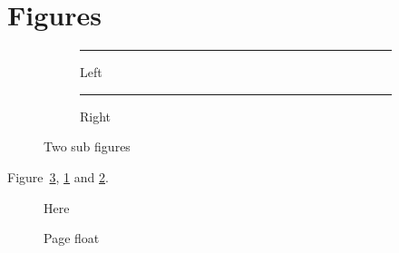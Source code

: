 \documentclass{article}
\begin{document}
\listoffigures
\section{Figures}
\begin{figure}[htbp]\centering
\begin{subfigure}[b]{.45\textwidth}\centering\rule{3cm}{2cm}\caption{Left}\label{sf:l}\end{subfigure}\hfill
\begin{subfigure}[b]{.45\textwidth}\centering\rule{3cm}{2cm}\caption{Right}\label{sf:r}\end{subfigure}
\caption{Two sub figures}\label{f:two}\end{figure}
Figure~\ref{f:two}, \ref{sf:l} and \ref{sf:r}.
\begin{figure}[H]\centering{}\caption{Here}\end{figure}
\begin{minipage}{.5\textwidth}\end{minipage}
\clearpage
\begin{figure}[p]\centering\scalebox{.5}{\rule{4cm}{4cm}}\caption{Page float}\end{figure}
\end{document}
